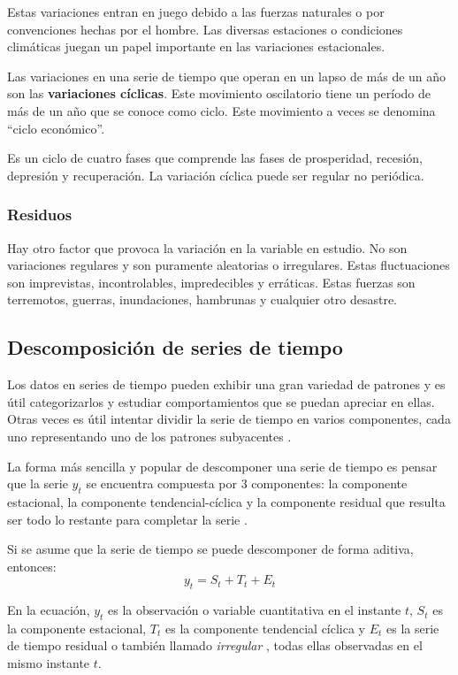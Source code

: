     Estas variaciones entran en juego debido a las fuerzas naturales o por convenciones hechas por el hombre. Las diversas estaciones o condiciones climáticas juegan un papel 
    importante en las variaciones estacionales. 

    Las variaciones en una serie de tiempo que operan en un lapso de más de un año son las \textbf{variaciones cíclicas}. Este movimiento oscilatorio tiene un período de más de un año que se conoce como ciclo.
    Este movimiento a veces se denomina ``ciclo económico''.

    Es un ciclo de cuatro fases que comprende las fases de prosperidad, recesión, depresión y recuperación. La variación cíclica puede ser regular no periódica.

    \subsubsection{Residuos}
    
    Hay otro factor que provoca la variación en la variable en estudio. No son variaciones regulares y son puramente aleatorias o irregulares. 
    Estas fluctuaciones son imprevistas, incontrolables, impredecibles y erráticas. Estas fuerzas son terremotos, guerras, inundaciones, hambrunas y cualquier otro desastre.

    \subsection{Descomposición de series de tiempo}
    Los datos en series de tiempo pueden exhibir una gran variedad de patrones y es útil categorizarlos y estudiar
    comportamientos que se puedan apreciar en ellas. Otras veces es útil intentar dividir la serie de tiempo en varios componentes,
    cada uno representando uno de los patrones subyacentes \cite{20}.

    La forma más sencilla y popular de descomponer una serie de tiempo es pensar que la serie $y_t$ se encuentra compuesta por 
    3 componentes: la componente estacional, la componente tendencial-cíclica y la componente residual que resulta ser
    todo lo restante para completar la serie \cite{20}.

    Si se asume que la serie de tiempo se puede descomponer de forma aditiva, entonces:
    \begin{equation}
        y_t = S_t + T_t + E_t
     \end{equation}
        
     En la ecuación,  $y_t$ es la observación o variable cuantitativa en el instante $t$, $S_t$ es la componente estacional, $T_t$ es la componente tendencial cíclica
     y $E_t$ es la serie de tiempo residual o también llamado \textit{irregular} \cite{20}, todas ellas observadas en el mismo instante $t$.

